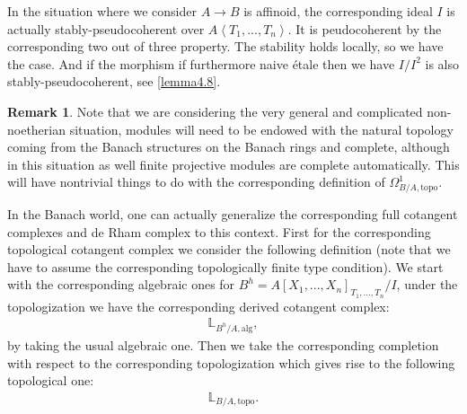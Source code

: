 \documentclass[12pt]{amsart}
\theoremstyle{definition}
\newtheorem{remark}[theorem]{Remark}
\numberwithin{equation}{section}
\begin{document}
\indent In the situation where we consider $A\rightarrow B$ is affinoid, the corresponding ideal $I$ is actually stably-pseudocoherent over $A\left<T_1,...,T_n\right>$. It is peudocoherent by the corresponding two out of three property. The stability holds locally, so we have the case. And if the morphism if furthermore naive \'etale then we have $I/I^2$ is also stably-pseudocoherent, see \cref{lemma4.8}. 

\begin{remark}
Note that we are considering the very general and complicated non-noetherian situation, modules will need to be endowed with the natural topology coming from the Banach structures on the Banach rings and complete, although in this situation as well finite projective modules are complete automatically. This will have nontrivial things to do with the corresponding definition of $\Omega^1_{B/A,\mathrm{topo}}$.	
\end{remark}



\indent In the Banach world, one can actually generalize the corresponding full cotangent complexes and de Rham complex to this context. First for the corresponding topological cotangent complex we consider the following definition (note that we have to assume the corresponding topologically finite type condition). We start with the corresponding algebraic ones for $B^h=A[X_1,...,X_n]_{T_1,...,T_n}/I$, under the topologization we have the corresponding derived cotangent complex:
\begin{align}
\mathbb{L}_{B^h/A,\mathrm{alg}},	
\end{align}
by taking the usual algebraic one. Then we take the corresponding completion with respect to the corresponding topologization which gives rise to the following topological one:
\begin{align}
\mathbb{L}_{B/A,\mathrm{topo}}.	
\end{align}
\end{document}
